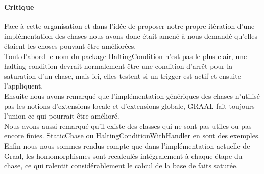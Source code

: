         \paragraph{Critique}
        Face à cette organisation et dans l'idée de proposer notre propre itération d'une implémentation des chases  nous avons donc était amené à nous demandé qu'elles étaient les choses pouvant être améliorées.\\
        Tout d'abord le nom du package HaltingCondition n'est pas le plus clair, une halting condition devrait normalement être une condition d'arrêt pour la saturation d'un chase, mais ici, elles testent si un trigger est actif et ensuite l'appliquent.\\
        Ensuite nous avons remarqué que l'implémentation génériques des chases n'utilisé pas les notions d'extensions locale et d'extensions globale, GRAAL fait toujours l'union ce qui pourrait être amélioré.\\
        Nous avons aussi remarqué qu'il existe des classes qui ne sont pas utiles ou pas encore finies. StaticChase ou HaltingConditionWithHandler en sont des exemples.\\
        Enfin nous nous sommes rendus compte que dans l'implémentation actuelle de Graal, les homomorphismes sont recalculés intégralement à chaque étape du chase, ce qui ralentit considérablement le calcul de la base de faits saturée.
        
     
